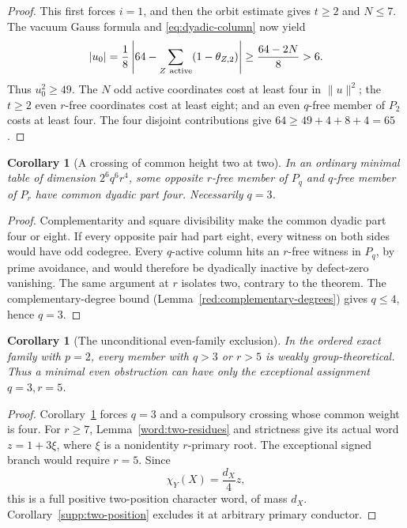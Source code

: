 \documentclass[11pt,a4paper]{article}
\numberwithin{equation}{section}
\newtheorem{corollary}[theorem]{Corollary}
\begin{document}
\begin{proof}
This first forces \(i=1\), and then the orbit estimate gives
\(t\ge2\) and \(N\le7\).
The vacuum Gauss formula and \eqref{eq:dyadic-column} now yield
\[
 |u_0|=\frac18\left|64-\sum_{Z\ {\rm active}}
                       (1-\theta_{Z,2})\right|
       \ge\frac{64-2N}{8}>6.
\]
Thus \(u_0^2\ge49\).  The \(N\) odd active coordinates cost
at least four in \(\|u\|^2\); the \(t\ge2\) even
\(r\)-free coordinates cost at least eight; and an even
\(q\)-free member of \(P_2\) costs at least four.
The four disjoint contributions give $64\ge49+4+8+4=65$.
\end{proof}

\begin{corollary}[A crossing of common height two at two]
\label{red:dyadic-crossing}
In an ordinary minimal table of dimension \(2^6q^6r^4\),
some opposite \(r\)-free member of \(P_q\) and \(q\)-free
member of \(P_r\) have common dyadic part four.  Necessarily \(q=3\).
\end{corollary}
\begin{proof}
Complementarity and square divisibility make the common
dyadic part four or eight.  If every opposite pair had
part eight, every witness on both sides would have
odd codegree.  Every \(q\)-active column hits an
\(r\)-free witness in \(P_q\), by prime avoidance, and
would therefore be dyadically inactive by defect-zero
vanishing.  The same argument at \(r\) isolates two,
contrary to the theorem.  The complementary-degree bound
(Lemma~\ref{red:complementary-degrees}) gives $q\le4$, hence $q=3$.
\end{proof}

\begin{corollary}[The unconditional even-family exclusion]
\label{red:even-boundary}
In the ordered exact family with $p=2$, every member with $q>3$
or $r>5$ is weakly group-theoretical. Thus a minimal even
obstruction can have only the exceptional assignment $q=3,r=5$.
\end{corollary}
\begin{proof}
Corollary~\ref{red:dyadic-crossing} forces $q=3$ and a
compulsory crossing whose common weight is four. For $r\ge7$,
Lemma~\ref{word:two-residues} and strictness give its
actual word $z=1+3\xi$, where $\xi$ is a nonidentity
$r$-primary root. The exceptional signed branch would require
$r=5$. Since
\[
                         \chi_Y(X)=\frac{d_X}{4}z,
\]
this is a full positive two-position character word, of mass
$d_X$. Corollary~\ref{supp:two-position} excludes it at arbitrary primary
conductor.
\end{proof}
\end{document}
